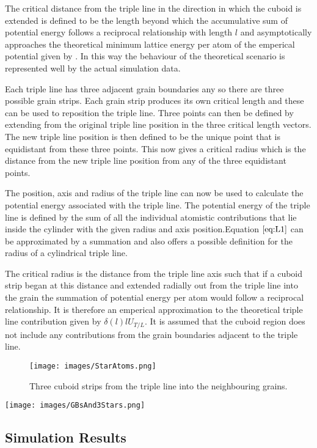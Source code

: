 \documentclass[12pt,a4paper]{book}
\begin{document}
The critical distance from the triple line in the direction in which the cuboid is extended is defined to be the length beyond which the accumulative sum of potential energy follows a reciprocal relationship with length $l$ and asymptotically approaches the theoretical minimum lattice energy per atom of the emperical potential given by \cite{Zope2003}. In this way the behaviour of the theoretical scenario is represented well by the actual simulation data.

Each triple line has three adjacent grain boundaries any so there are three possible grain strips. Each grain strip produces its own critical length and these can be used to reposition the triple line. Three points can then be defined by extending from the original triple line position in the three critical length vectors. The new triple line position is then defined to be the unique point that is equidistant from these three points. This now gives a critical radius which is the distance from the new triple line position from any of the three equidistant points.

The position, axis and radius of the triple line can now be used to calculate the potential energy associated with the triple line. The potential energy of the triple line is defined by the sum of all the individual atomistic contributions that lie inside the cylinder with the given radius and axis position.Equation $\ref{eq:L1}$ can be approximated by a summation and also offers a possible definition for the radius of a cylindrical triple line.

The critical radius is the distance from the triple line axis such that if a cuboid strip began at this distance and extended radially out from the triple line into the grain the summation of potential energy per atom would follow a reciprocal relationship.   It is therefore an emperical approximation to the theoretical triple line contribution given by $\delta(l) l U_{T/L}$. It is assumed that the cuboid region does not include any contributions from the grain boundaries adjacent to the triple line.

\begin{figure}
	\texttt{[image: images/StarAtoms.png]} 
	\label{fig:StarAtoms}
	\caption{Three cuboid strips from the triple line into the
	neighbouring grains.}
\end{figure}

\texttt{[image: images/GBsAnd3Stars.png]} 

\subsection{Simulation Results} \label{sec:SimulationResults}
\end{document}
